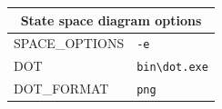 \documentclass[11pt]{article}
\begin{document}
\begin{center}
\bigskip

\begin{tabular}{|p{}|p{}|}
\hline
\multicolumn{2}{|c|}{State space diagram options}\\ \hline
\textsc{\ttfamily SPACE\_OPTIONS} &\verb+-e+\\
\textsc{\ttfamily DOT} &\verb+bin\dot.exe+ \\
\textsc{\ttfamily DOT\_FORMAT} &\verb+png+\\\hline
\end{tabular}

\end{center}
\end{document}
